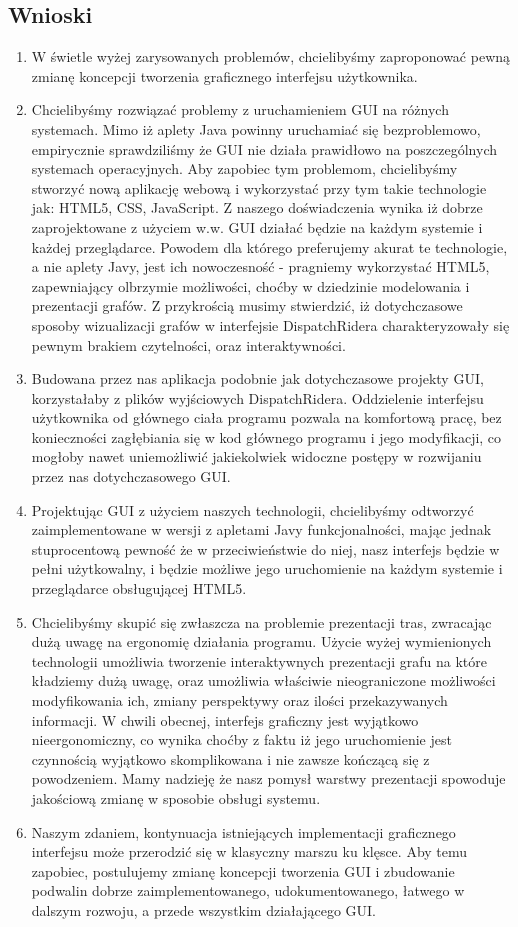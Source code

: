 \subsection{Wnioski}
\begin{enumerate}
\item W świetle wyżej zarysowanych problemów, chcielibyśmy zaproponować pewną zmianę koncepcji tworzenia graficznego interfejsu użytkownika.
\item Chcielibyśmy rozwiązać problemy z uruchamieniem GUI na różnych systemach. Mimo iż aplety Java powinny uruchamiać się bezproblemowo, empirycznie sprawdziliśmy że GUI nie działa prawidłowo na poszczególnych systemach operacyjnych. Aby zapobiec tym problemom, chcielibyśmy stworzyć nową aplikację webową i wykorzystać przy tym takie technologie jak: HTML5, CSS, JavaScript. Z naszego doświadczenia wynika iż dobrze zaprojektowane z użyciem w.w. GUI działać będzie na każdym systemie i każdej przeglądarce. Powodem dla którego preferujemy akurat te technologie, a nie aplety Javy, jest ich nowoczesność - pragniemy wykorzystać HTML5, zapewniający olbrzymie możliwości, choćby w dziedzinie modelowania i prezentacji grafów. Z przykrością musimy stwierdzić, iż dotychczasowe sposoby wizualizacji grafów w interfejsie DispatchRidera charakteryzowały się pewnym brakiem czytelności, oraz interaktywności.
\item Budowana przez nas aplikacja podobnie jak dotychczasowe projekty GUI, korzystałaby z plików wyjściowych DispatchRidera. Oddzielenie interfejsu użytkownika od głównego ciała programu pozwala na komfortową pracę, bez konieczności zagłębiania się w kod głównego programu i jego modyfikacji, co mogłoby nawet uniemożliwić jakiekolwiek widoczne postępy w rozwijaniu przez nas dotychczasowego GUI.
\item Projektując GUI z użyciem naszych technologii, chcielibyśmy odtworzyć zaimplementowane w wersji z apletami Javy funkcjonalności, mając jednak stuprocentową pewność że w przeciwieństwie do niej, nasz interfejs będzie w pełni użytkowalny, i będzie możliwe jego uruchomienie na każdym systemie i przeglądarce obsługującej HTML5.
\item Chcielibyśmy skupić się zwłaszcza na problemie prezentacji tras, zwracając dużą uwagę na ergonomię działania programu. Użycie wyżej wymienionych technologii umożliwia tworzenie interaktywnych prezentacji grafu na które kładziemy dużą uwagę, oraz umożliwia właściwie nieograniczone możliwości modyfikowania ich, zmiany perspektywy oraz ilości przekazywanych informacji. W chwili obecnej, interfejs graficzny jest wyjątkowo nieergonomiczny, co wynika choćby z faktu iż jego uruchomienie jest czynnością wyjątkowo skomplikowana i nie zawsze kończącą się z powodzeniem. Mamy nadzieję że nasz pomysł warstwy prezentacji spowoduje jakościową zmianę w sposobie obsługi systemu.
\item Naszym zdaniem, kontynuacja istniejących implementacji graficznego interfejsu może przerodzić się w klasyczny marszu ku klęsce. Aby temu zapobiec, postulujemy zmianę koncepcji tworzenia GUI i zbudowanie podwalin dobrze zaimplementowanego, udokumentowanego, łatwego w dalszym rozwoju, a przede wszystkim działającego GUI.
\end{enumerate}
